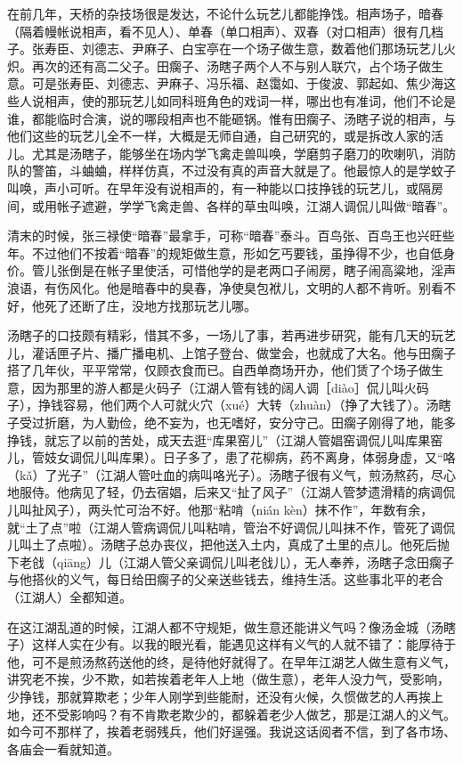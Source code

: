 \documentclass[12pt,UTF8]{ctexbook}
\begin{document}
在前几年，天桥的杂技场很是发达，不论什么玩艺儿都能挣饯。相声场子，暗春（隔着幔帐说相声，看不见人）、单春（单口相声）、双春（对口相声）很有几档子。张寿臣、刘德志、尹麻子、白宝亭在一个场子做生意，数着他们那场玩艺儿火炽。再次的还有高二父子。田瘸子、汤瞎子两个人不与别人联穴，占个场子做生意。可是张寿臣、刘德志、尹麻子、冯乐福、赵霭如、于俊波、郭起如、焦少海这些人说相声，使的那玩艺儿如同科班角色的戏词一样，哪出也有准词，他们不论是谁，都能临时合演，说的哪段相声也不能砸锅。惟有田瘸子、汤瞎子说的相声，与他们这些的玩艺儿全不一样，大概是无师自通，自己研究的，或是拆改人家的活儿。尤其是汤瞎子，能够坐在场内学飞禽走兽叫唤，学磨剪子磨刀的吹喇叭，消防队的警笛，斗蛐蛐，样样仿真，不过没有真的声音大就是了。他最惊人的是学蚊子叫唤，声小可听。在早年没有说相声的，有一种能以口技挣钱的玩艺儿，或隔房间，或用帐子遮避，学学飞禽走兽、各样的草虫叫唤，江湖人调侃儿叫做“暗春”。

清末的时候，张三禄使“暗春”最拿手，可称“暗春”泰斗。百鸟张、百鸟王也兴旺些年。不过他们不按着“暗春”的规矩做生意，形如乞丐要钱，虽挣得不少，也自低身价。管儿张倒是在帐子里使活，可惜他学的是老两口子闹房，瞎子闹高粱地，淫声浪语，有伤风化。他是暗春中的臭春，净使臭包袱儿，文明的人都不肯听。别看不好，他死了还断了庄，没地方找那玩艺儿哪。

汤瞎子的口技颇有精彩，惜其不多，一场儿了事，若再进步研究，能有几天的玩艺儿，灌话匣子片、播广播电机、上馆子登台、做堂会，也就成了大名。他与田瘸子搭了几年伙，平平常常，仅顾衣食而已。自西单商场开办，他们赁了个场子做生意，因为那里的游人都是火码子（江湖人管有钱的阔人调［diào］侃儿叫火码子），挣钱容易，他们两个人可就火穴（xué）大转（zhuàn）（挣了大钱了）。汤瞎子受过折磨，为人勤俭，绝不妄为，也无嗜好，安分守己。田瘸子刚得了地，能多挣钱，就忘了以前的苦处，成天去逛“库果窑儿”（江湖人管娼窑调侃儿叫库果窑儿，管妓女调侃儿叫库果）。日子多了，患了花柳病，药不离身，体弱身虚，又“咯（kǎ）了光子”（江湖人管吐血的病叫咯光子）。汤瞎子很有义气，煎汤熬药，尽心地服侍。他病见了轻，仍去宿娼，后来又“扯了风子”（江湖人管梦遗滑精的病调侃儿叫扯风子），两头忙可治不好。他那“粘啃（nián kèn）抹不作”，年数有余，就“土了点”啦（江湖人管病调侃儿叫粘啃，管治不好调侃儿叫抹不作，管死了调侃儿叫土了点啦）。汤瞎子总办丧仪，把他送入土内，真成了土里的点儿。他死后抛下老戗（qiāng）儿（江湖人管父亲调侃儿叫老戗儿），无人奉养，汤瞎子念田瘸子与他搭伙的义气，每日给田瘸子的父亲送些钱去，维持生活。这些事北平的老合（江湖人）全都知道。

在这江湖乱道的时候，江湖人都不守规矩，做生意还能讲义气吗？像汤金城（汤瞎子）这样人实在少有。以我的眼光看，能遇见这样有义气的人就不错了：能厚待于他，可不是煎汤熬药送他的终，是待他好就得了。在早年江湖艺人做生意有义气，讲究老不挨，少不欺，如若挨着老年人上地（做生意），老年人没力气，受影响，少挣钱，那就算欺老；少年人刚学到些能耐，还没有火候，久惯做艺的人再挨上地，还不受影响吗？有不肯欺老欺少的，都躲着老少人做艺，那是江湖人的义气。如今可不那样了，挨着老弱残兵，他们好逞强。我说这话阅者不信，到了各市场、各庙会一看就知道。
\end{document}
